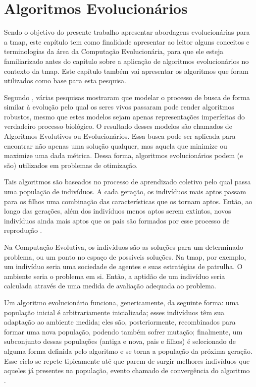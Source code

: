 \chapter{Algoritmos Evolucionários}
\label{alg_evo}

Sendo o objetivo do presente trabalho apresentar abordagens evolucionárias para 
a \ac{tmap}, este capítulo tem como finalidade apresentar ao leitor alguns 
conceitos e terminologias da área da Computação Evolucionária, para que ele 
esteja familiarizado antes do capítulo sobre a aplicação de algoritmos 
evolucionários no contexto da \ac{tmap}. Este capítulo também vai apresentar os 
algoritmos que foram utilizados como base para esta pesquisa.

Segundo \citep{Back:1993:OEA:1326623.1326625}, várias pesquisas mostraram que 
modelar o processo de busca de forma similar à evolução pelo qual os seres 
vivos passaram pode render algoritmos robustos, mesmo que estes modelos sejam 
apenas representações imperfeitas do verdadeiro processo biológico. O resultado 
desses modelos são chamados de Algoritmos Evolutivos ou Evolucionários. Essa 
busca pode ser aplicada para encontrar não apenas uma solução qualquer, mas 
aquela que minimize ou maximize uma dada métrica. Dessa forma, algoritmos 
evolucionários podem (e são) utilizados em problemas de otimização.

Tais algoritmos são baseados no processo de aprendizado coletivo pelo qual passa 
uma população de indivíduos. A cada geração, os indivíduos mais aptos passam 
para os filhos uma combinação das características que os tornam aptos. Então, ao 
longo das gerações, além dos indivíduos menos aptos serem extintos, novos 
indivíduos ainda mais aptos que os pais são formados por esse processo de 
reprodução \citep{Back:1993:OEA:1326623.1326625}.

Na Computação Evolutiva, os indivíduos são as soluções para um determinado 
problema, ou um ponto no espaço de possíveis soluções. Na \ac{tmap}, por 
exemplo, um indivíduo seria uma sociedade de agentes e suas estratégias de 
patrulha. O ambiente seria o problema em si. Então, a aptidão de um indivíduo 
seria calculada através de uma medida de avaliação adequada ao problema.

Um algoritmo evolucionário funciona, genericamente, da seguinte forma: uma 
população inicial é arbitrariamente inicializada; esses indivíduos têm sua 
adaptação ao ambiente medida; eles são, posteriormente, recombinados para formar 
uma nova população, podendo também sofrer mutação; finalmente, um subconjunto 
dessas populações (antiga e nova, pais e filhos) é selecionado de alguma forma 
definida pelo algoritmo e se torna a população da próxima geração. Esse ciclo 
se repete tipicamente até que parem de surgir melhores indivíduos que aqueles já 
presentes na população, evento chamado de convergência do algoritmo 
\citep{Back:1993:OEA:1326623.1326625}.

